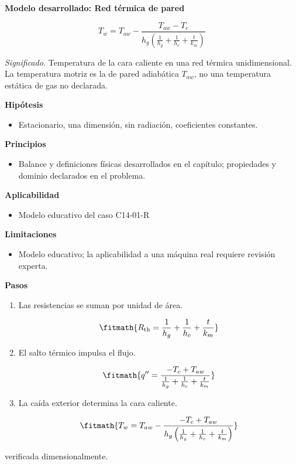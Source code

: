 \documentclass[10pt,openany]{book}
\begin{document}
\begin{tcolorbox}[title={Desarrollos del modelo}, studiumdef, breakable]

\noindent\textbf{Modelo desarrollado: Red térmica de pared}

\begin{equation}
T_w=T_{aw}-\frac{T_{aw}-T_c}{h_g\left(\frac1{h_g}+\frac1{h_c}+\frac{t}{k_m}\right)}
\label{eq:EC-C14}
\end{equation}

\noindent\textit{Significado.} Temperatura de la cara caliente en una red térmica unidimensional. La temperatura motriz es la de pared adiabática $T_{aw}$, no una temperatura estática de gas no declarada.

\noindent\textbf{Hipótesis}
\begin{itemize}
\item Estacionario, una dimensión, sin radiación, coeficientes constantes.
\end{itemize}

\noindent\textbf{Principios}
\begin{itemize}
\item Balance y definiciones físicas desarrollados en el capítulo; propiedades y dominio declarados en el problema.
\end{itemize}

\noindent\textbf{Aplicabilidad}
\begin{itemize}
\item Modelo educativo del caso C14-01-R
\end{itemize}

\noindent\textbf{Limitaciones}
\begin{itemize}
\item Modelo educativo; la aplicabilidad a una máquina real requiere revisión experta.
\end{itemize}

\noindent\textbf{Pasos}
\begin{enumerate}
\item
Las resistencias se suman por unidad de área.

\[
\fitmath{R_{\mathrm{th}}=\frac{1}{h_g} + \frac{1}{h_c} + \frac{t}{k_m}}
\]
\item
El salto térmico impulsa el flujo.

\[
\fitmath{q''=\frac{- T_c + T_{aw}}{\frac{1}{h_g} + \frac{1}{h_c} + \frac{t}{k_m}}}
\]
\item
La caída exterior determina la cara caliente.

\[
\fitmath{T_w=T_{aw} - \frac{- T_c + T_{aw}}{h_g \left(\frac{1}{h_g} + \frac{1}{h_c} + \frac{t}{k_m}\right)}}
\]
\end{enumerate}

{\noindent\footnotesize verificada dimensionalmente.\par}
\end{tcolorbox}
\end{document}
